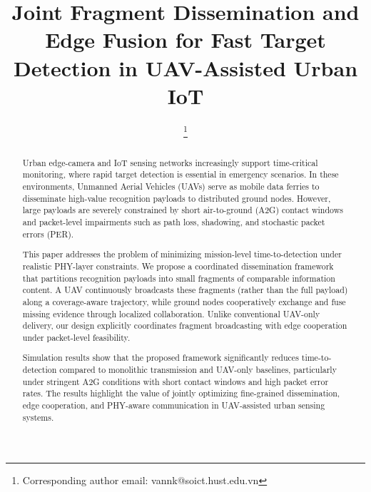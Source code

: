\documentclass[conference]{IEEEtran}
\begin{document}
\title{Joint Fragment Dissemination and Edge Fusion for Fast Target Detection in UAV-Assisted Urban IoT\\
}

\author{
    \thanks{Corresponding author email: vannk@soict.hust.edu.vn}
}

\maketitle
\begin{abstract}
Urban edge-camera and IoT sensing networks increasingly support time-critical monitoring, where rapid target detection is essential in emergency scenarios. In these environments, Unmanned Aerial Vehicles (UAVs) serve as mobile data ferries to disseminate high-value recognition payloads to distributed ground nodes. However, large payloads are severely constrained by short air-to-ground (A2G) contact windows and packet-level impairments such as path loss, shadowing, and stochastic packet errors (PER).

This paper addresses the problem of minimizing mission-level time-to-detection under realistic PHY-layer constraints. We propose a coordinated dissemination framework that partitions recognition payloads into small fragments of comparable information content. A UAV continuously broadcasts these fragments (rather than the full payload) along a coverage-aware trajectory, while ground nodes cooperatively exchange and fuse missing evidence through localized collaboration. Unlike conventional UAV-only delivery, our design explicitly coordinates fragment broadcasting with edge cooperation under packet-level feasibility.

Simulation results show that the proposed framework significantly reduces time-to-detection compared to monolithic transmission and UAV-only baselines, particularly under stringent A2G conditions with short contact windows and high packet error rates. The results highlight the value of jointly optimizing fine-grained dissemination, edge cooperation, and PHY-aware communication in UAV-assisted urban sensing systems.



\end{abstract}
\end{document}
